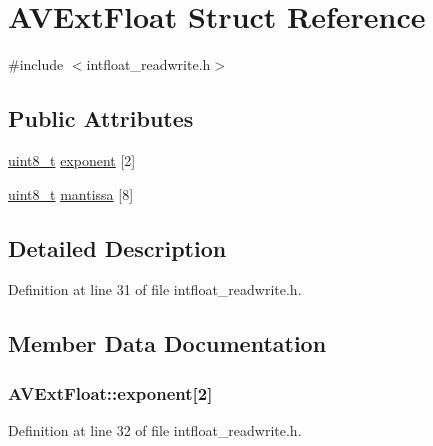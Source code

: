 \hypertarget{struct_a_v_ext_float}{}\section{A\+V\+Ext\+Float Struct Reference}
\label{struct_a_v_ext_float}


{\ttfamily \#include $<$intfloat\+\_\+readwrite.\+h$>$}

\subsection*{Public Attributes}
\begin{DoxyCompactItemize}
\item 
\hyperlink{lib-src_2ffmpeg_2win32_2stdint_8h_a9a941819355e6f658991890ff66b4b0e}{uint8\+\_\+t} \hyperlink{struct_a_v_ext_float_a9d652cf1d521aba900e5d938b002bf13}{exponent} \mbox{[}2\mbox{]}
\item 
\hyperlink{lib-src_2ffmpeg_2win32_2stdint_8h_a9a941819355e6f658991890ff66b4b0e}{uint8\+\_\+t} \hyperlink{struct_a_v_ext_float_ad5136584e57730e43b595674717f4bd8}{mantissa} \mbox{[}8\mbox{]}
\end{DoxyCompactItemize}


\subsection{Detailed Description}


Definition at line 31 of file intfloat\+\_\+readwrite.\+h.



\subsection{Member Data Documentation}
\subsubsection[{\texorpdfstring{exponent}{exponent}}]{ A\+V\+Ext\+Float\+::exponent\mbox{[}2\mbox{]}}\hypertarget{struct_a_v_ext_float_a9d652cf1d521aba900e5d938b002bf13}{}\label{struct_a_v_ext_float_a9d652cf1d521aba900e5d938b002bf13}


Definition at line 32 of file intfloat\+\_\+readwrite.\+h.

